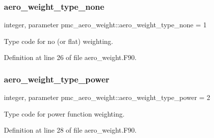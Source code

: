 \subsubsection{\texorpdfstring{aero\+\_\+weight\+\_\+type\+\_\+none}{aero\_weight\_type\_none}}
{\footnotesize\ttfamily integer, parameter pmc\+\_\+aero\+\_\+weight\+::aero\+\_\+weight\+\_\+type\+\_\+none = 1}



Type code for no (or flat) weighting. 



Definition at line 26 of file aero\+\_\+weight.\+F90.

\mbox{\label{namespacepmc__aero__weight_a9ee33fc5875ba3405147a7fa0c2e90d9}} 
\subsubsection{\texorpdfstring{aero\+\_\+weight\+\_\+type\+\_\+power}{aero\_weight\_type\_power}}
{\footnotesize\ttfamily integer, parameter pmc\+\_\+aero\+\_\+weight\+::aero\+\_\+weight\+\_\+type\+\_\+power = 2}



Type code for power function weighting. 



Definition at line 28 of file aero\+\_\+weight.\+F90.

